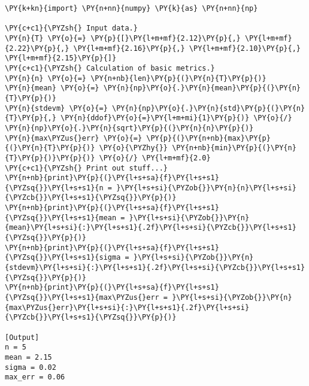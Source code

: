 \begin{Verbatim}[label=\makebox{\href{https://bitbucket.org/lbaldini/statnotes/src/master/snippets/mean\_stdev.py}{https://bitbucket.org/.../mean\_stdev.py}},commandchars=\\\{\}]
\PY{k+kn}{import} \PY{n+nn}{numpy} \PY{k}{as} \PY{n+nn}{np}

\PY{c+c1}{\PYZsh{} Input data.}
\PY{n}{T} \PY{o}{=} \PY{p}{[}\PY{l+m+mf}{2.12}\PY{p}{,} \PY{l+m+mf}{2.22}\PY{p}{,} \PY{l+m+mf}{2.16}\PY{p}{,} \PY{l+m+mf}{2.10}\PY{p}{,} \PY{l+m+mf}{2.15}\PY{p}{]}
\PY{c+c1}{\PYZsh{} Calculation of basic metrics.}
\PY{n}{n} \PY{o}{=} \PY{n+nb}{len}\PY{p}{(}\PY{n}{T}\PY{p}{)}
\PY{n}{mean} \PY{o}{=} \PY{n}{np}\PY{o}{.}\PY{n}{mean}\PY{p}{(}\PY{n}{T}\PY{p}{)}
\PY{n}{stdevm} \PY{o}{=} \PY{n}{np}\PY{o}{.}\PY{n}{std}\PY{p}{(}\PY{n}{T}\PY{p}{,} \PY{n}{ddof}\PY{o}{=}\PY{l+m+mi}{1}\PY{p}{)} \PY{o}{/} \PY{n}{np}\PY{o}{.}\PY{n}{sqrt}\PY{p}{(}\PY{n}{n}\PY{p}{)}
\PY{n}{max\PYZus{}err} \PY{o}{=} \PY{p}{(}\PY{n+nb}{max}\PY{p}{(}\PY{n}{T}\PY{p}{)} \PY{o}{\PYZhy{}} \PY{n+nb}{min}\PY{p}{(}\PY{n}{T}\PY{p}{)}\PY{p}{)} \PY{o}{/} \PY{l+m+mf}{2.0}
\PY{c+c1}{\PYZsh{} Print out stuff...}
\PY{n+nb}{print}\PY{p}{(}\PY{l+s+sa}{f}\PY{l+s+s1}{\PYZsq{}}\PY{l+s+s1}{n = }\PY{l+s+si}{\PYZob{}}\PY{n}{n}\PY{l+s+si}{\PYZcb{}}\PY{l+s+s1}{\PYZsq{}}\PY{p}{)}
\PY{n+nb}{print}\PY{p}{(}\PY{l+s+sa}{f}\PY{l+s+s1}{\PYZsq{}}\PY{l+s+s1}{mean = }\PY{l+s+si}{\PYZob{}}\PY{n}{mean}\PY{l+s+si}{:}\PY{l+s+s1}{.2f}\PY{l+s+si}{\PYZcb{}}\PY{l+s+s1}{\PYZsq{}}\PY{p}{)}
\PY{n+nb}{print}\PY{p}{(}\PY{l+s+sa}{f}\PY{l+s+s1}{\PYZsq{}}\PY{l+s+s1}{sigma = }\PY{l+s+si}{\PYZob{}}\PY{n}{stdevm}\PY{l+s+si}{:}\PY{l+s+s1}{.2f}\PY{l+s+si}{\PYZcb{}}\PY{l+s+s1}{\PYZsq{}}\PY{p}{)}
\PY{n+nb}{print}\PY{p}{(}\PY{l+s+sa}{f}\PY{l+s+s1}{\PYZsq{}}\PY{l+s+s1}{max\PYZus{}err = }\PY{l+s+si}{\PYZob{}}\PY{n}{max\PYZus{}err}\PY{l+s+si}{:}\PY{l+s+s1}{.2f}\PY{l+s+si}{\PYZcb{}}\PY{l+s+s1}{\PYZsq{}}\PY{p}{)}

[Output]
n = 5
mean = 2.15
sigma = 0.02
max_err = 0.06
\end{Verbatim}